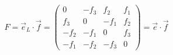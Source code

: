 \begin{equation}
F=\vec{e}_{L} \cdot \vec{f}=\left(
\begin{array}{cccc}
0     & -f_{3} & f_{2} & f_{1} \\
f_{3} &   0    &  -f_{1} & f_{2} \\
-f_{2} & -f_{1} &  0     &  f_{3} \\
-f_{1} &  -f_{2} & -f_{3} &  0 
\end{array}
\right)= \vec{e} \cdot \vec{f}
\end{equation}

